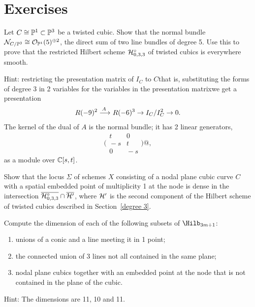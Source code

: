 \section{Exercises}
\begin{exercise}\label{twisted cubic normal bundle}
Let $C \cong \mathbb P^1 \subset \mathbb P^3$ be a twisted cubic. Show that the normal
bundle ${\mathcal N}_{C/\mathbb P^3} \cong {\mathcal O}_{\mathbb P^1}(5)^{\oplus 2}$, the direct sum
of two line bundles of degree 5. Use this to prove that the restricted
Hilbert scheme $\mathcal H^\circ_{0,3,3}$ of twisted cubics is everywhere
smooth.

Hint:
restricting the presentation matrix of $I_C$ to $C$\emdash that is,
sub\-sti\-tuting the forms of degree 3 in 2 variables for the variables in
the presentation \null matrix\emdash we get a presentation
$$
R(-9)^2 \ruto {\,A} R(-6)^3 \to I_C/I_C^2 \to 0
.
$$
The kernel of the dual of $A$ is the normal bundle; it has 2 linear
generators,
$$
\biggl(
\begin{smallmatrix}
t&0\\[2pt]
\!-s&t\\[2pt]
0&\!-s
\end{smallmatrix}
\biggr)
@,
$$
as a module over ${\mathbb C}[s,t]$.
\end{exercise}

\begin{exercise}\label{hilb intersection}
Show that the locus $\Sigma$ of schemes $X$ consisting of a nodal plane
cubic curve $C$ with a spatial embedded point of multiplicity 1 at the
node is dense in the intersection $\overline{\mathcal H^\circ_{0,3,3}} \cap
\overline{\mathcal H'}$, where $\mathcal H'$ is the second component of the Hilbert
scheme of twisted cubics described in Section~\ref{degree 3}.
\end{exercise}

\begin{exercise}
 Compute the dimension of each of the following subsets of $\Hilb_{3m+1}$:

\begin{enumerate}
 \item unions of a conic and a line meeting it in 1 point;
 \item the connected union of 3 lines not all contained in the same plane;
 \item nodal plane cubics together with an embedded point at the node
 that is not contained in the plane of
 the cubic.
\end{enumerate}

Hint: The dimensions are 11, 10 and 11.
\end{exercise}

